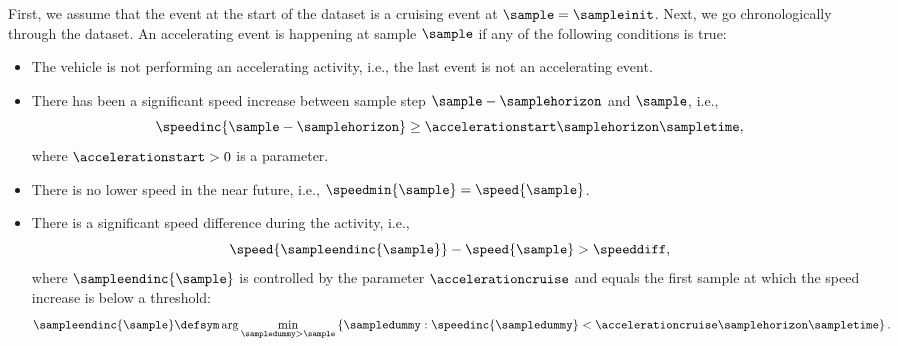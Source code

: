 First, we assume that the event at the start of the dataset is a cruising event at $\sample=\sampleinit$. Next, we go chronologically through the dataset. An accelerating event is happening at sample $\sample$ if any of the following conditions is true:
\begin{itemize}
	\item The vehicle is not performing an accelerating activity, i.e., the last event is not an accelerating event.
	\item \cstarta There has been a significant speed increase between sample step $\sample-\samplehorizon$ and $\sample$, i.e., 
	\begin{equation}
		\label{eq:start acceleration}
		\speedinc{\sample-\samplehorizon} \geq \accelerationstart\samplehorizon\sampletime,
	\end{equation} \cenda
	where $\accelerationstart>0$ is a parameter.
	\item There is no lower speed in the near future, i.e., $\speedmin{\sample}=\speed{\sample}$.
	\item There is a significant speed difference during the activity, i.e., 
	\begin{equation}
		\speed{\sampleendinc{\sample}} - \speed{\sample} > \speeddiff,
	\end{equation}
	where $\sampleendinc{\sample}$ is controlled by the parameter $\accelerationcruise$ and \cstarta equals the first sample at which the speed increase is below a threshold\cenda:
	\begin{equation}
		\label{eq:end acceleration}
		\sampleendinc{\sample} \defsym \arg \min_{\sampledummy > \sample} \left\{ \sampledummy: \speedinc{\sampledummy} < \accelerationcruise\samplehorizon\sampletime \right\}.
	\end{equation}
\end{itemize}

